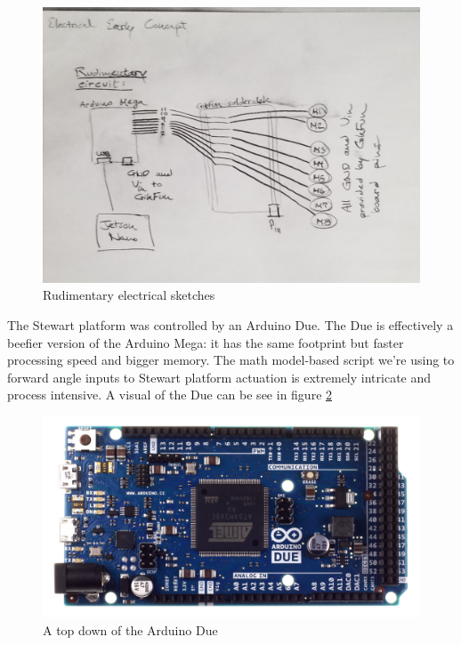 \documentclass[a4paper, 10pt]{article}
\begin{document}
 		\begin{figure} [!h]
			\centering
			\includegraphics[scale=0.2]{Photos/early_electrical}
			\caption{Rudimentary electrical sketches}
			\label{basic_electrical}
		\end{figure}

 		The Stewart platform was controlled by an Arduino Due. The Due is effectively a beefier version of the Arduino Mega: it has the same footprint but faster processing speed and bigger memory. The math model-based script we're using to forward angle inputs to Stewart platform actuation is extremely intricate and process intensive. A visual of the Due can be see in figure \ref{arduino_due}
 		
 		\begin{figure} [!h]
			\centering
			\includegraphics[scale=0.2]{Photos/arduino_due}
			\caption{A top down of the Arduino Due}
			\label{arduino_due}
		\end{figure}
 
\end{document}
